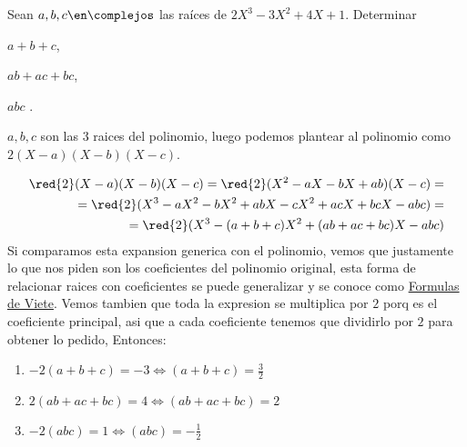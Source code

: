 \begin{enunciado}{\ejercicio}
  Sean $a, b, c \en \complejos$ las raíces de $2X^3 - 3X^2 + 4X + 1$. Determinar
  \begin{enumerate}[label=\roman*)]
    \begin{multicols}{3}
      \item $a + b + c$,
      \item $ab + ac + bc$,
      \item $abc$ .
    \end{multicols}
  \end{enumerate}
\end{enunciado}

$a, b, c$ son las 3 raices del polinomio, luego podemos plantear al polinomio como 
$2(X-a)(X-b)(X-c)$. 

\begin{align}
\red{2}(X-a)(X-b)(X-c) = \red{2}(X^2 - aX - bX + ab)(X - c) = \\
= \red{2}(X^3 - aX^2 - bX^2 + abX -cX^2 +acX +bcX - abc) = \\
= \red{2}(X^3 -(a + b + c)X^2 + (ab + ac + bc)X - abc)
\end{align}
Si comparamos esta expansion generica con el polinomio, vemos que justamente lo que nos piden son los coeficientes
del polinomio original, esta forma de relacionar raices con coeficientes se puede generalizar y se conoce como \href{https://en.wikipedia.org/wiki/Vieta\%27s_formulas}{Formulas de Viete}. 
Vemos tambien que toda la expresion se multiplica por $2$ porq es el coeficiente principal, asi que a cada coeficiente tenemos que dividirlo por $2$
para obtener lo pedido, Entonces:
\begin{enumerate}[label=\roman*)]
  \item $-2(a+b+c) = -3 \iff (a+b+c) = \frac{3}{2}$
  \item $2(ab + ac + bc) = 4 \iff (ab + ac + bc) = 2$
  \item $-2(abc) = 1 \iff (abc) = -\frac{1}{2}$

\end{enumerate}

\begin{aportes}
 \item {}
\end{aportes}

